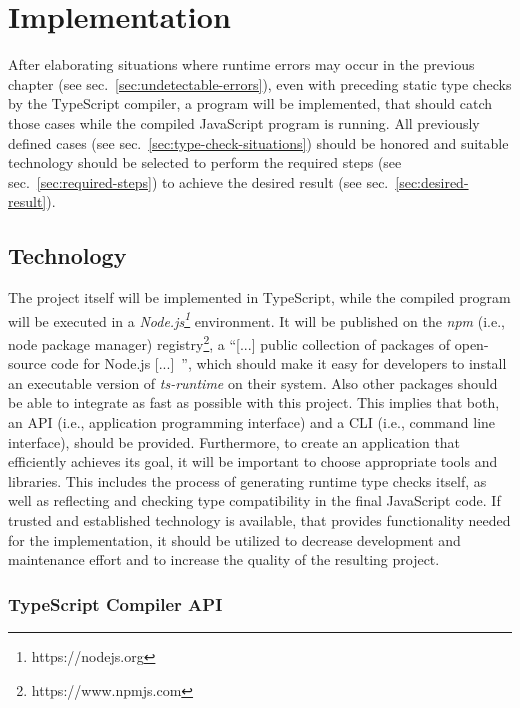 
\chapter{Implementation}
\label{cha:implementation}

After elaborating situations where runtime errors may occur in the previous chapter (see sec.~\ref{sec:undetectable-errors}), even with preceding static type checks by the TypeScript compiler, a program will be implemented, that should catch those cases while the compiled JavaScript program is running. All previously defined cases (see sec.~\ref{sec:type-check-situations}) should be honored and suitable technology should be selected to perform the required steps (see sec.~\ref{sec:required-steps}) to achieve the desired result (see sec.~\ref{sec:desired-result}).

\section{Technology}
\label{sec:technology}

The project itself will be implemented in TypeScript, while the compiled program will be executed in a \emph{Node.js\footnote{https://nodejs.org}} environment. It will be published on the \emph{npm} (i.e., node package manager) registry\footnote{https://www.npmjs.com}, a ``[...] public collection of packages of open-source code for Node.js [...]~\cite{npmjs:about}'', which should make it easy for developers to install an executable version of \emph{ts-runtime} on their system. Also other packages should be able to integrate as fast as possible with this project. This implies that both, an API (i.e., application programming interface) and a CLI (i.e., command line interface), should be provided. Furthermore, to create an application that efficiently achieves its goal, it will be important to choose appropriate tools and libraries. This includes the process of generating runtime type checks itself, as well as reflecting and checking type compatibility in the final JavaScript code. If trusted and established technology is available, that provides functionality needed for the implementation, it should be utilized to decrease development and maintenance effort and to increase the quality of the resulting project.

\subsection{TypeScript Compiler API}

